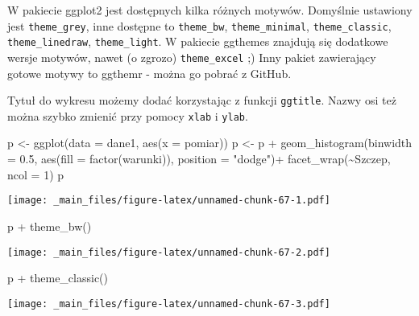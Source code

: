 \documentclass[
]{book}
\newenvironment{Shaded}{\begin{snugshade}}{\end{snugshade}}
\newcommand{\AttributeTok}[1]{\textcolor[rgb]{0.77,0.63,0.00}{#1}}
\newcommand{\DecValTok}[1]{\textcolor[rgb]{0.00,0.00,0.81}{#1}}
\newcommand{\FloatTok}[1]{\textcolor[rgb]{0.00,0.00,0.81}{#1}}
\newcommand{\FunctionTok}[1]{\textcolor[rgb]{0.00,0.00,0.00}{#1}}
\newcommand{\NormalTok}[1]{#1}
\newcommand{\OtherTok}[1]{\textcolor[rgb]{0.56,0.35,0.01}{#1}}
\newcommand{\SpecialCharTok}[1]{\textcolor[rgb]{0.00,0.00,0.00}{#1}}
\newcommand{\StringTok}[1]{\textcolor[rgb]{0.31,0.60,0.02}{#1}}
\begin{document}
W pakiecie ggplot2 jest dostępnych kilka różnych motywów. Domyślnie ustawiony jest \texttt{theme\_grey}, inne dostępne to \texttt{theme\_bw}, \texttt{theme\_minimal}, \texttt{theme\_classic}, \texttt{theme\_linedraw}, \texttt{theme\_light}. W pakiecie ggthemes znajdują się dodatkowe wersje motywów, nawet (o zgrozo) \texttt{theme\_excel} ;) Inny pakiet zawierający gotowe motywy to ggthemr - można go pobrać z GitHub.

Tytuł do wykresu możemy dodać korzystając z funkcji \texttt{ggtitle}. Nazwy osi też można szybko zmienić przy pomocy \texttt{xlab} i \texttt{ylab}.

\begin{Shaded}
\begin{Highlighting}[]
\NormalTok{p }\OtherTok{\textless{}{-}} \FunctionTok{ggplot}\NormalTok{(}\AttributeTok{data =}\NormalTok{ dane1, }\FunctionTok{aes}\NormalTok{(}\AttributeTok{x =}\NormalTok{ pomiar))}
\NormalTok{p }\OtherTok{\textless{}{-}}\NormalTok{ p }\SpecialCharTok{+} \FunctionTok{geom\_histogram}\NormalTok{(}\AttributeTok{binwidth =} \FloatTok{0.5}\NormalTok{, }\FunctionTok{aes}\NormalTok{(}\AttributeTok{fill =} \FunctionTok{factor}\NormalTok{(warunki)), }\AttributeTok{position =} \StringTok{"dodge"}\NormalTok{)}\SpecialCharTok{+}
  \FunctionTok{facet\_wrap}\NormalTok{(}\SpecialCharTok{\textasciitilde{}}\NormalTok{Szczep, }\AttributeTok{ncol =} \DecValTok{1}\NormalTok{)}
\NormalTok{p}
\end{Highlighting}
\end{Shaded}

\texttt{[image: \_main\_files/figure-latex/unnamed-chunk-67-1.pdf]}

\begin{Shaded}
\begin{Highlighting}[]
\NormalTok{p }\SpecialCharTok{+} \FunctionTok{theme\_bw}\NormalTok{()}
\end{Highlighting}
\end{Shaded}

\texttt{[image: \_main\_files/figure-latex/unnamed-chunk-67-2.pdf]}

\begin{Shaded}
\begin{Highlighting}[]
\NormalTok{p }\SpecialCharTok{+} \FunctionTok{theme\_classic}\NormalTok{()}
\end{Highlighting}
\end{Shaded}

\texttt{[image: \_main\_files/figure-latex/unnamed-chunk-67-3.pdf]}
\end{document}
